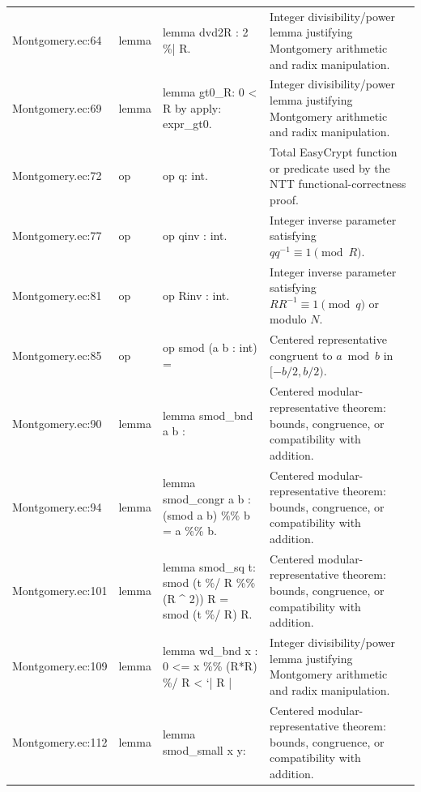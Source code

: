 \documentclass[10pt]{article}
\begin{document}
\begin{longtable}{L{0.11\textwidth}L{0.05\textwidth}L{0.38\textwidth}L{0.42\textwidth}}
Montgomery.\allowbreak{}ec:\allowbreak{}64 & lemma & {\ttfamily\scriptsize lemma dvd2R : 2 \%| R.} & Integer divisibility/power lemma justifying Montgomery arithmetic and radix manipulation. \\
Montgomery.\allowbreak{}ec:\allowbreak{}69 & lemma & {\ttfamily\scriptsize lemma gt0\_R: 0 < R by apply: expr\_gt0.} & Integer divisibility/power lemma justifying Montgomery arithmetic and radix manipulation. \\
Montgomery.\allowbreak{}ec:\allowbreak{}72 & op & {\ttfamily\scriptsize op q: int.} & Total EasyCrypt function or predicate used by the NTT functional-correctness proof. \\
Montgomery.\allowbreak{}ec:\allowbreak{}77 & op & {\ttfamily\scriptsize op qinv : int.} & Integer inverse parameter satisfying $qq^{-1}\equiv1\pmod R$. \\
Montgomery.\allowbreak{}ec:\allowbreak{}81 & op & {\ttfamily\scriptsize op Rinv : int.} & Integer inverse parameter satisfying $RR^{-1}\equiv1\pmod q$ or modulo $N$. \\
Montgomery.\allowbreak{}ec:\allowbreak{}85 & op & {\ttfamily\scriptsize op smod (a b : int) =} & Centered representative congruent to $a\bmod b$ in $[-b/2,b/2)$. \\
Montgomery.\allowbreak{}ec:\allowbreak{}90 & lemma & {\ttfamily\scriptsize lemma smod\_bnd a b :} & Centered modular-representative theorem: bounds, congruence, or compatibility with addition. \\
Montgomery.\allowbreak{}ec:\allowbreak{}94 & lemma & {\ttfamily\scriptsize lemma smod\_congr a b :  (smod a b) \%\% b = a \%\% b.} & Centered modular-representative theorem: bounds, congruence, or compatibility with addition. \\
Montgomery.\allowbreak{}ec:\allowbreak{}101 & lemma & {\ttfamily\scriptsize lemma smod\_sq t: smod (t \%/ R \%\% (R \textasciicircum{} 2)) R = smod (t \%/ R) R.} & Centered modular-representative theorem: bounds, congruence, or compatibility with addition. \\
Montgomery.\allowbreak{}ec:\allowbreak{}109 & lemma & {\ttfamily\scriptsize lemma wd\_bnd x : 0 <= x  \%\% (R*R) \%/ R < `| R |} & Integer divisibility/power lemma justifying Montgomery arithmetic and radix manipulation. \\
Montgomery.\allowbreak{}ec:\allowbreak{}112 & lemma & {\ttfamily\scriptsize lemma smod\_small x y:} & Centered modular-representative theorem: bounds, congruence, or compatibility with addition. \\

\end{longtable}
\end{document}
